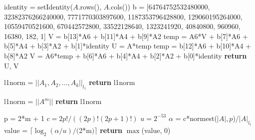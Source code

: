 \begin{algorithm}
	\caption{Pad\'e of Order 13} 
	\begin{algorithmic}[1]
		\State identity = setIdentity($A$.rows(), $A$.cols())
		\State b = [64764752532480000, 32382376266240000, 7771770303897600, 1187353796428800, 129060195264000, 10559470521600, 670442572800, 33522128640, 1323241920, 40840800, 960960, 16380, 182, 1]
		\State V = b[13]*A6 + b[11]*A4 + b[9]*A2
		\State temp = A6*V + b[7]*A6 + b[5]*A4 + b[3]*A2 + b[1]*identity
		\State U = A*temp
		\State temp = b[12]*A6 + b[10]*A4 + b[8]*A2
        \State V = A6*temp + b[6]*A6 + b[4]*A4 + b[2]*A2 + b[0]*identity
        \State \textbf{return} U, V
        \EndProcedure
	\end{algorithmic} 
\end{algorithm}

\begin{algorithm}
	\caption{Normest of Multiple Matrices} 
	\begin{algorithmic}[1]
        \State l1norm = $||A_{1}, A_{2}, \ldots, A_{k}||_{l_{1}}$ 
        \State \textbf{return} l1norm 
        \EndProcedure
	\end{algorithmic} 
\end{algorithm}

\begin{algorithm}
	\caption{Normest of Matrix Power} 
	\begin{algorithmic}[1]
        \State l1norm = $||A^{m}||$ 
        \State \textbf{return} l1norm 
        \EndProcedure
	\end{algorithmic} 
\end{algorithm}

\begin{algorithm}
	\caption{ell} 
	\begin{algorithmic}[1]
        \State p = 2*m + 1
        \State $c = {2p!}/((2p)!(2p+1)!)$ 
        \State $u = 2^{-53}$ 
        \State $\alpha$ = c*normest($|A|, p$)/$|A|_{l_{1}}$
        \State value = $\lceil \log_{2}({\alpha/u})/($2*m$)\rceil$
        \State \textbf{return} $\max$(value, 0)
        \EndProcedure
	\end{algorithmic} 
\end{algorithm}